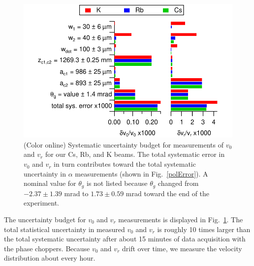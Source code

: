 \documentclass[twocolumn,pra,showpacs,superscriptaddress,longbibliography]{revtex4-1}   %
\newcommand{\figref}[1]{Fig.~\ref{#1}}
\begin{document}
\begin{figure}
\includegraphics[width=\linewidth,keepaspectratio]{displayVelErrors.pdf}
\caption{\label{velError}(Color online) Systematic uncertainty budget for measurements of $v_0$ and $v_r$ for our Cs, Rb, and K beams. 
The total systematic error in $v_0$ and $v_r$ in turn contributes toward the total systematic uncertainty in $\alpha$ measurements (shown in \figref{polError}).
A nominal value for $\theta_g$ is not listed because $\theta_g$ changed from $-2.37 \pm 1.39$ mrad to $1.73 \pm 0.59$ mrad toward the end of the experiment.}
\end{figure}

The uncertainty budget for $v_0$ and $v_r$ measurements is displayed in \figref{velError}. 
The total statistical uncertainty in measured $v_0$ and $v_r$ is roughly 10 times larger than the total systematic uncertainty after about 15 minutes of data acquisition with the phase choppers.
Because $v_0$ and $v_r$ drift over time, we measure the velocity distribution about every hour. 
\end{document}
